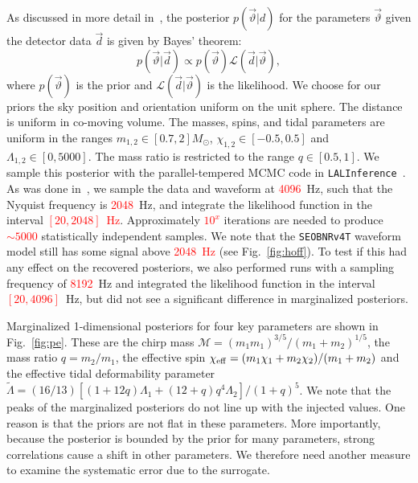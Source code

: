 \documentclass[prd,aps,letter,twocolumn,floatfix,notitlepage,nofootinbib]{revtex4-1}
\newcommand{\red}[1]{\textcolor{red}{#1}}
\begin{document}
As discussed in more detail in~\cite{BNSPE}, the posterior $p(\vec\vartheta | d)$ for the parameters $\vec\vartheta$ given the detector data $\vec d$ is given by Bayes' theorem:
\begin{equation}
p(\vec\vartheta | \vec d) \propto p(\vec\vartheta) \mathcal{L}(\vec d | \vec\vartheta),
\end{equation}
where $p(\vec\vartheta)$ is the prior and $\mathcal{L}(\vec d | \vec\vartheta)$ is the likelihood. We choose for our priors the sky position and orientation uniform on the unit sphere. The distance is uniform in co-moving volume. The masses, spins, and tidal parameters are uniform in the ranges $m_{1, 2} \in [0.7, 2]M_\odot$, $\chi_{1,2} \in [-0.5, 0.5]$ and $\Lambda_{1,2} \in [0, 5000]$. The mass ratio is restricted to the range $q\in[0.5, 1]$. We sample this posterior with the parallel-tempered MCMC code in \texttt{LALInference}~\cite{lal}. As was done in~\cite{BNSPE}, we sample the data and waveform at \red{4096}~Hz, such that the Nyquist frequency is \red{2048}~Hz, and integrate the likelihood function in the interval \red{$[20, 2048]$~Hz}. Approximately \red{$10^x$} iterations are needed to produce \red{$\sim 5000$} statistically independent samples. We note that the \texttt{SEOBNRv4T} waveform model still has some signal above \red{2048~Hz} (see Fig.~\ref{fig:hoff}). To test if this had any effect on the recovered posteriors, we also performed runs with a sampling frequency of \red{8192}~Hz and integrated the likelihood function in the interval \red{$[20, 4096]$}~Hz, but did not see a significant difference in marginalized posteriors.

Marginalized 1-dimensional posteriors for four key parameters are shown in Fig.~\ref{fig:pe}. These are the chirp mass $\mathcal{M} = (m_1 m_1)^{3/5}/(m_1+m_2)^{1/5}$, the mass ratio $q=m_2/m_1$, the effective spin $\chi_{\rm eff} = (m_1\chi_1+m_2\chi_2)/(m_1+m_2)$ and the effective tidal deformability parameter $\tilde\Lambda = (16/13) [(1+12q)\Lambda_1 + (12+q)q^4\Lambda_2]/(1+q)^5$. We note that the peaks of the marginalized posteriors do not line up with the injected values. One reason is that the priors are not flat in these parameters. More importantly, because the posterior is bounded by the prior for many parameters, strong correlations cause a shift in other parameters. We therefore need another measure to examine the systematic error due to the surrogate.
\end{document}
